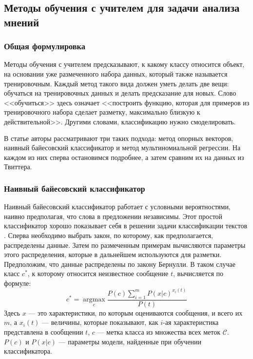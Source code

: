 \subsection{Методы обучения с учителем для задачи анализа мнений}

\subsubsection{Общая формулировка}
Методы обучения с учителем предсказывают, к какому классу относится объект, на основании уже
размеченного набора данных, который также называется тренировочным. Каждый метод такого вида должен
уметь делать две вещи: обучаться на тренировочных данных и делать предсказание для новых. Слово
<<обучиться>> здесь означает <<построить функцию, которая для примеров из тренировочного набора
сделает разметку, максимально близкую к действительной>>. Другими словами, классификацию нужно смоделировать.

В статье \cite{pang2002thumbs} авторы рассматривают три таких подхода: метод опорных
векторов, наивный байесовский классификатор и метод мультиномиальной регрессии. На каждом из них
сперва остановимся подробнее, а затем сравним их на данных из Твиттера.

\subsubsection{Наивный байесовский классификатор}
Наивный байесовский классификатор \cite{citeulike:11350907} работает с условными вероятностями,
наивно предполагая, что слова в предложении независимы. Этот простой классификатор хорошо показывает
себя в решении задачи классификации текстов \cite{manning1999foundations}. Сперва необходимо выбрать закон,
по которому, как предполагается, распределены данные. Затем по размеченным примерам вычисляются
параметры этого распределения, которые в дальнейшем используются для разметки. Предположим, что данные
распределены по закону Бернулли. В таком случае класс $c^*$, к которому относится
неизвестное сообщение $t$, вычисляется по формуле:
\begin{equation}
c^* = \underset{c}{\operatorname{arg max}} \frac{P(c) \sum\limits_{i=1}^m P(x|c)^{x_i(t)}}{P(t)}
\end{equation}
Здесь $x$ --- это характеристики, по которым оцениваются сообщения, и всего их $m$, а $x_i(t)$ --- величины, которые
показывают, как $i$-ая характеристика представлена в сообщении $t$, $c$ --- метка
класса из множества всех меток $\mathcal{C}$. $P(c)$ и $P(x|c)$ --- параметры
модели, найденные при обучении классификатора.

